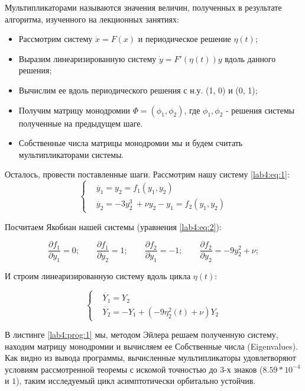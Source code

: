 \clearpage

Мультипликаторами называются значения величин, полученных в результате
алгоритма, изученного на лекционных занятиях:

\begin{itemize}
    \item Рассмотрим систему $\dot{x} = F(x)$ и периодическое решение $\eta(t)$;
    \item Выразим линеаризированную систему $\dot{y} = F'(\eta(t))y$ вдоль
    данного решения;
    \item Вычислим ее вдоль периодического решения с н.у. (1, 0) и (0, 1);
    \item Получим матрицу монодромии $\Phi = (\phi_1, \phi_2)$, где $\phi_1, \phi_2$ -
    решения системы полученные на предыдущем шаге.
    \item Собственные числа матрицы монодромии мы и будем считать мультипликаторами
    системы.
\end{itemize}

Осталось, провести поставленные шаги. Рассмотрим нашу систему \eqref{lab4:eq:1}:
\begin{equation}\label{lab4:eq:1}
    \begin{cases}
        &\dot{y_1} = y_2 = f_1(y_1, y_2) \\
        &\dot{y_2} = -3y_2^3\ + \nu y_2 - y_1 = f_2(y_1, y_2)
    \end{cases}
\end{equation}

Посчитаем Якобиан нашей системы (уравнения \eqref{lab4:eq:2}):

\begin{equation}\label{lab4:eq:2}
    \frac{\partial f_1}{\partial y_1} = 0;\qquad
    \frac{\partial f_1}{\partial y_2} = 1;\qquad
    \frac{\partial f_2}{\partial y_1} = -1;\qquad
    \frac{\partial f_2}{\partial y_2} = -9y_2^2 + \nu;
\end{equation}

И строим линеаризированную систему вдоль цикла $\eta(t)$:

\begin{equation}\label{lab4:eq:3}
    \begin{cases}
        &\dot{Y_1} = Y_2 \\
        &\dot{Y_2} = -Y_1 + (-9\eta_2^2(t) + \nu)Y_2
    \end{cases}
\end{equation}

В листинге \ref{lab4:prog:1} мы, методом Эйлера решаем полученную систему,
находим матрицу монодромии и вычисляем ее Собственные числа (Eigenvalues).
Как видно из вывода программы, вычисленные мультипликаторы удовлетворяют
условиям рассмотренной теоремы с искомой точностью до 3-х знаков
($8.59 * 10^{-4}$ и $1$), таким исследуемый цикл асимптотически орбитально устойчив.

